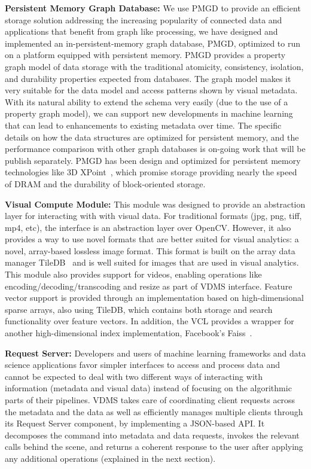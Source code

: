 \textbf{Persistent Memory Graph Database:}
We use PMGD to provide an efficient storage
solution addressing the increasing popularity of connected data and
applications that benefit from graph like processing, we have designed
and implemented an in-persistent-memory graph database, PMGD, optimized
to run on a platform equipped with persistent memory.
PMGD provides a property graph model of data storage with the traditional
atomicity, consistency, isolation, and durability properties expected from
databases. The graph model makes it very suitable for the data model and
access patterns shown by visual metadata.
With its natural ability to extend the schema very
easily (due to the use of a property graph model),
we can support new developments in machine learning that can lead to
enhancements to existing metadata over time.
The specific details on how the data structures are optimized for persistent
memory, and the performance comparison with other graph databases is on-going
work that will be publish separately.
PMGD has been design and optimized for persistent memory technologies
like 3D XPoint~\cite{IntelXPoint15}, which
promise storage providing nearly the speed of DRAM and the
durability of block-oriented storage.

\textbf{Visual Compute Module:} This module was designed to provide
an abstraction layer for interacting with with visual data.
For traditional formats (jpg, png, tiff, mp4, etc),
the interface is an abstraction layer over OpenCV. However, it also provides a
way to use novel formats that are better suited for visual analytics: a novel,
array-based lossless image format. This format is built on the array data
manager TileDB~\cite{TileDB} and is well suited for images that are used in
visual analytics.
This module also provides support for videos, enabling operations like
encoding/decoding/transcoding and resize as part of VDMS interface.
Feature vector support is provided through an implementation based
on high-dimensional sparse arrays, also using TileDB, which contains both
storage and search functionality over feature vectors.
In addition, the VCL provides a wrapper
for another high-dimensional index implementation,
Facebook's Faiss~\cite{faiss}.

\textbf{Request Server:}
Developers and users of machine learning frameworks and data science
applications favor simpler interfaces to access and process data and cannot
be expected to deal with two different ways of interacting with information
(metadata and visual data) instead of focusing on the
algorithmic parts of their pipelines.
VDMS takes care of coordinating client requests across the metadata and the
data as well as efficiently manages multiple clients through its Request
Server component, by implementing a JSON-based API.
It decomposes the command into
metadata and data requests, invokes the relevant calls behind the scene,
and returns a coherent response to the user after applying any additional
operations (explained in the next section).

